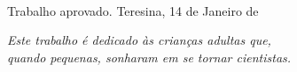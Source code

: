 \documentclass[
	12pt,				%
	openright,			%
	oneside,			%
	a4paper,			%
	chapter=TITLE,		%
	english,			%
	brazil,				%
	]{abntex2}
\begin{document}
\begin{folhadeaprovacao}

  \begin{center}
    {\ABNTEXchapterfont\bfseries\Large \imprimirtitulo}\\
    \vspace*{\fill}
    {\ABNTEXchapterfont\large \imprimirautor}
    
    \vspace*{\fill}\vspace*{\fill}
    \hspace{.45\textwidth}
    \begin{minipage}{.5\textwidth}
        \imprimirpreambulo
    \end{minipage}%
    \vspace*{\fill}
   
   \ABNTEXchapterfont     
   {Trabalho aprovado. Teresina, 14 de Janeiro de \imprimirdata}
   \end{center}
   


  
\end{folhadeaprovacao}


\begin{dedicatoria}
  \vspace*{\fill}
   \centering
   \noindent
   \textit{ Este trabalho é dedicado às crianças adultas que,\\
   quando pequenas, sonharam em se tornar cientistas.} 
   \vspace*{\fill}
\end{dedicatoria}
\end{document}
